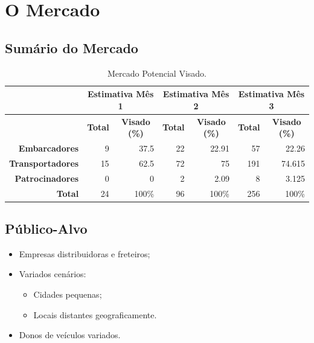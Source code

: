 \chapter{O Mercado}
\label{cap:OMercado}
	
	\section{Sumário do Mercado}
	
	\begin{table}[htbp]
		\centering
		\small 
		\caption{Mercado Potencial Visado.}
		\begin{tabular}{rrrrrrr}
			\toprule
			\multicolumn{1}{c}{\multirow{2}[4]{*}{\textbf{}}} & \multicolumn{2}{c}{\textbf{Estimativa Mês 1}} & \multicolumn{2}{c}{\textbf{Estimativa Mês 2}} & \multicolumn{2}{c}{\textbf{Estimativa Mês 3}} \\
			\midrule
			\multicolumn{1}{c}{} & \multicolumn{1}{c}{\textbf{Total}} & \multicolumn{1}{c}{\textbf{Visado (\%)}} & \multicolumn{1}{c}{\textbf{Total}} & \multicolumn{1}{c}{\textbf{Visado (\%)}} & \multicolumn{1}{c}{\textbf{Total}} & \multicolumn{1}{c}{\textbf{Visado (\%)}} \\
			\textbf{Embarcadores} & 9     & 37.5  & 22    & 22.91 & 57    & 22.26 \\
			\textbf{Transportadores} & 15    & 62.5  & 72    & 75    & 191   & 74.615 \\
			\textbf{Patrocinadores} & 0     & 0     & 2     & 2.09  & 8     & 3.125 \\
			\textbf{Total} & 24    & 100\% & 96    & 100\% & 256   & 100\% \\
			\bottomrule
		\end{tabular}%
		\label{tab:addlabel}%
	\end{table}%
	
	\section{Público-Alvo}
		\begin{itemize}
			\item Empresas distribuidoras e freteiros;
			
			\item Variados cenários:
			\begin{itemize}
				\item Cidades pequenas;
				
				\item Locais distantes geograficamente.
			\end{itemize}
			
			\item Donos de veículos variados.
		\end{itemize}
	
